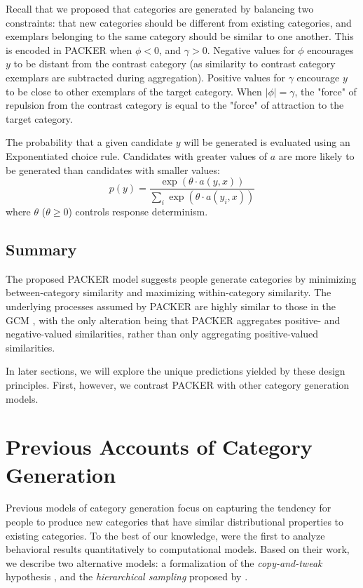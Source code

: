 \documentclass[10pt,letterpaper]{article}
\begin{document}
Recall that we proposed that categories are generated by balancing two constraints: that new categories should be different from existing categories, and exemplars belonging to the same category should be similar to one another. This is encoded in PACKER when $\phi < 0$, and $\gamma > 0$. Negative values for $\phi$ encourages $y$ to be distant from the contrast category (as similarity to contrast category exemplars are subtracted during aggregation). Positive values for $\gamma$ encourage $y$ to be close to other exemplars of the target category. When $|\phi| = \gamma$, the "force" of repulsion from the contrast category is equal to the "force" of attraction to the target category.

The probability that a given candidate $y$ will be generated is evaluated using an Exponentiated \citet{luce1977choice} choice rule. Candidates with greater values of $a$ are more likely to be generated than candidates with smaller values:
\begin{equation}
p(y) = \dfrac
    { \exp( { \theta \cdot a(y, x) } ) }
    { \sum_i{ \exp( { \theta \cdot a(y_i, x) } ) } }
    \label{eq:packer-choice}
\end{equation}
where $\theta$ ($\theta \geq 0$) controls response determinism. 

\subsection{Summary}
The proposed PACKER model suggests people generate categories by minimizing between-category similarity and maximizing within-category similarity. The underlying processes assumed by PACKER are highly similar to those in the GCM \citep{nosofsky1984choice}, with the only alteration being that PACKER aggregates positive- and negative-valued similarities, rather than only aggregating positive-valued similarities.

In later sections, we will explore the unique predictions yielded by these design principles. First, however, we contrast PACKER with other category generation models. 


\section{Previous Accounts of Category Generation}

Previous models of category generation focus on capturing the tendency for people to produce new categories that have similar distributional properties to existing categories. To the best of our knowledge, \citet{jern2013probabilistic} were the first to analyze behavioral results quantitatively to computational models. Based on their work, we describe two alternative models: a formalization of the \textit{copy-and-tweak} hypothesis \citep{ward2002role,ward1995s}, and the \textit{hierarchical sampling} proposed by \citet{jern2013probabilistic}.
\end{document}
